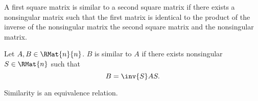 


A first square matrix is similar to a second square matrix if there exists a nonsingular matrix such that the first matrix is identical to the product of the inverse of the nonsingular matrix the second square matrix and the nonsingular matrix.


Let $A, B \in \RMat{n}{n}$.
$B$ is similar to $A$ if there exists nonsingular $S \in \RMat{n}$ such that
$$
  B = \inv{S}AS.
$$


\begin{prop}
  Similarity is an equivalence relation.
\end{prop}
